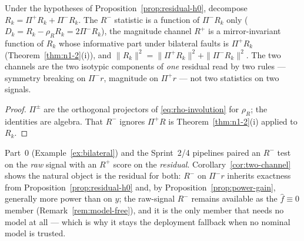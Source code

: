 \begin{corollary}
\label{cor:two-channel}
Under the hypotheses of Proposition~\ref{prop:residual-h0}, decompose
$R_k = \Pi^{+}R_k + \Pi^{-}R_k$. The $R^{-}$ statistic is a function of
$\Pi^{-}R_k$ only ($D_k = R_k - \rho_R R_k = 2\Pi^{-}R_k$), the magnitude
channel $R^{+}$ is a mirror-invariant function of $R_k$ whose informative
part under bilateral faults is $\Pi^{+}R_k$ (Theorem~\ref{thm:n1-2}(i)), and
$\|R_k\|^2 = \|\Pi^{+}R_k\|^2 + \|\Pi^{-}R_k\|^2$. The two channels are the
two isotypic components of \emph{one} residual read by two rules ---
symmetry breaking on $\Pi^{-}r$, magnitude on $\Pi^{+}r$ --- not two
statistics on two signals.
\end{corollary}

\begin{proof}
$\Pi^\pm$ are the orthogonal projectors of \eqref{eq:rho-involution} for
$\rho_R$; the identities are algebra. That $R^{-}$ ignores $\Pi^{+}R$ is
Theorem~\ref{thm:n1-2}(i) applied to $R_k$.
\end{proof}

\begin{remark}
Part~0 (Example~\ref{ex:bilateral}) and the Sprint~2/4 pipelines paired an
$R^{-}$ test on the \emph{raw} signal with an $R^{+}$ score on the
\emph{residual}. Corollary~\ref{cor:two-channel} shows the natural object is
the residual for both: $R^{-}$ on $\Pi^{-}r$ inherits exactness from
Proposition~\ref{prop:residual-h0} and, by Proposition~\ref{prop:power-gain},
generally more power than on $y$; the raw-signal $R^{-}$ remains available
as the $\hat f \equiv 0$ member (Remark~\ref{rem:model-free}), and it is the
only member that needs no model at all --- which is why it stays the
deployment fallback when no nominal model is trusted.
\end{remark}

